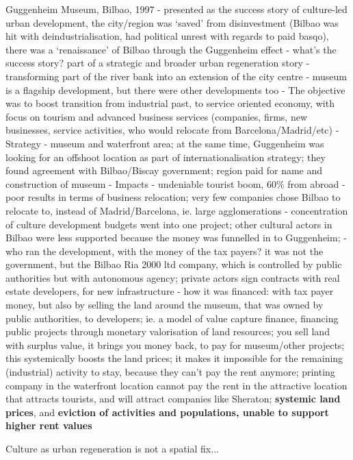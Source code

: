\documentclass{article}
\begin{document}
Guggenheim Museum, Bilbao, 1997
- presented as the success story of culture-led urban development, the city/region was `saved' from disinvestment (Bilbao was hit with deindustrialisation, had political unrest with regards to paid basqo), there was a `renaissance' of Bilbao through the Guggenheim effect 
- what's the success story? part of a strategic and broader urban regeneration story
	- transforming part of the river bank into an extension of the city centre 
	- museum is a flagship development, but there were other developments too
	- The objective was to boost transition from industrial past, to service oriented economy, with focus on tourism and advanced business services (companies, firms, new businesses, service activities, who would relocate from Barcelona/Madrid/etc)
- Strategy	
	- museum and waterfront area; at the same time, Guggenheim was looking for an offshoot location as part of internationalisation strategy; they found agreement with Bilbao/Biscay government; region paid for name and construction of museum
- Impacts 
	- undeniable tourist boom, 60\% from abroad 
	- poor results in terms of business relocation; very few companies chose Bilbao to relocate to, instead of Madrid/Barcelona, ie. large agglomerations
	- concentration of culture development budgets went into one project; other cultural actors in Bilbao were less supported because the money was funnelled in to Guggenheim;
	- who ran the development, with the money of the tax payers? it was not the government, but the Bilbao Ria 2000 ltd company, which is controlled by public authorities but with autonomous agency; private actors sign contracts with real estate developers, for new infrastructure
	- how it was financed: with tax payer money, but also by selling the land around the museum, that was owned by public authorities, to developers; ie. a model of value capture finance, financing public projects through monetary valorisation of land resources; you sell land with surplus value, it brings you money back, to pay for museum/other projects; this systemically boosts the land prices; it makes it impossible for the remaining (industrial) activity to stay, because they can't pay the rent anymore; printing company in the waterfront location cannot pay the rent in the attractive location that attracts tourists, and will attract companies like Sheraton; \textbf{systemic land prices}, and \textbf{eviction of activities and populations, unable to support higher rent values}

Culture as urban regeneration is not a spatial fix... 
\end{document}
